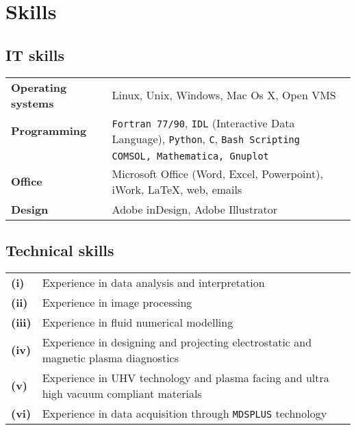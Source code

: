 \section{Skills}

\subsection{IT skills}
\begin{tabular}{ll}
\textbf{Operating systems} & Linux, Unix, Windows, Mac Os X, Open VMS
\\
\textbf{Programming} & \texttt{Fortran 77/90}, \texttt{IDL} (Interactive Data Language),
\texttt{Python}, \texttt{C}, \texttt{Bash Scripting} \\
 & \texttt{COMSOL, Mathematica, Gnuplot} \\
\textbf{Office} & Microsoft Office (Word, Excel, Powerpoint), iWork,
\LaTeX, web, emails \\
\textbf{Design} & Adobe inDesign, Adobe Illustrator
\end{tabular}

\subsection{Technical skills}
\begin{tabular}{>{\bfseries}l p{15cm}}
(i)   & Experience in data analysis and interpretation \\
(ii)  & Experience in image processing \\
(iii) & Experience in fluid numerical modelling \\
(iv) & Experience in designing and projecting electrostatic and
magnetic plasma diagnostics \\
(v)  & Experience in UHV technology and plasma facing and ultra high
  vacuum compliant materials \\
(vi) & Experience in data acquisition through \texttt{MDSPLUS} technology
\end{tabular}
